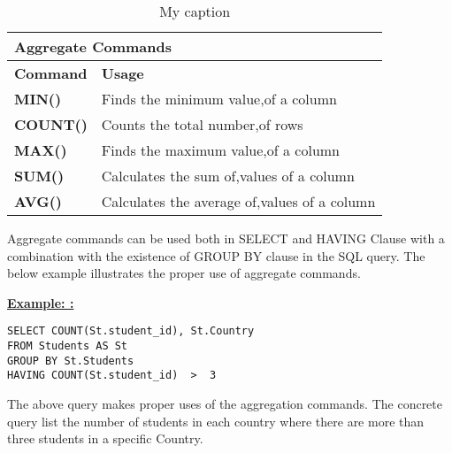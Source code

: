 \begin{table}[h]
\centering
\caption{My caption}
\label{my-label}
\begin{tabular}{|l|l|}
\hline
\multicolumn{2}{|l|}{\textbf{Aggregate Commands}}                                                             \\ \hline
\textbf{Command}                        & \textbf{Usage}                                                      \\ \hline
{\color[HTML]{333333} \textbf{MIN()}}   & {\color[HTML]{333333} Finds the minimum value,of a column}          \\ \hline
{\color[HTML]{333333} \textbf{COUNT()}} & {\color[HTML]{333333} Counts the total number,of rows}              \\ \hline
{\color[HTML]{333333} \textbf{MAX()}}   & {\color[HTML]{333333} Finds the maximum value,of a column}          \\ \hline
{\color[HTML]{333333} \textbf{SUM()}}   & {\color[HTML]{333333} Calculates the sum of,values of a column}     \\ \hline
{\color[HTML]{333333} \textbf{AVG()}}   & {\color[HTML]{333333} Calculates the average of,values of a column} \\ \hline
\end{tabular}
\end{table}


Aggregate commands can be used both in SELECT and HAVING Clause with a combination with the existence of GROUP BY clause in the SQL query. The below example illustrates the proper use of aggregate commands.


\noindent\textbf{\underline{Example: :} }
\begin{mdframed}[backgroundcolor=gray!20] 
\begin{lstlisting}
SELECT COUNT(St.student_id), St.Country
FROM Students AS St 
GROUP BY St.Students
HAVING COUNT(St.student_id)  >  3
\end{lstlisting}
\end{mdframed}

The above query makes proper uses of the aggregation commands. The concrete query list the number of students in each country where there are more than three students in a specific Country. 

